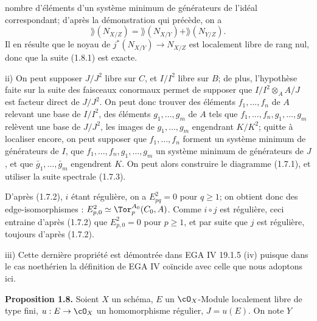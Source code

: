 nombre d'éléments d'un système minimum de générateurs de l'idéal correspondant; d'après la démonstration qui précède, on a
\[
 \rang(N_{X/Z})=\rang(N_{X/Y})+\rang(N_{Y/Z}).
\]
Il en résulte que le noyau de $j^*(N_{X/Y})\longrightarrow N_{X/Z}$ est localement libre de rang nul, donc que la suite (1.8.1) est exacte.

ii) On peut supposer $J/J^2$ libre sur $C$, et $I/I^2$ libre sur $B$; de plus, l'hypothèse faite sur la suite des faisceaux conormaux permet de supposer que $I/I^2\otimes_A A/J$ est facteur direct de $J/J^2$. On peut donc trouver des éléments $f_1,\ldots,f_n$ de $A$ relevant une base de $I/I^2$, des éléments $g_1,\ldots,g_m$ de $A$ tels que $f_1,\ldots,f_n,g_1,\ldots,g_m$ relèvent une base de $J/J^2$, les images de $g_1,\ldots,g_m$ engendrant $K/K^2$; quitte à localiser encore, on peut supposer que $f_1,\ldots,f_n$ forment un système minimum de générateurs de $I$, que $f_1,\ldots,f_n,g_1,\ldots,g_m$ un système minimum de générateurs de $J$, et que $\bar g_1,\ldots,\bar g_m$ engendrent $K$. On peut alors construire le diagramme (1.7.1), et utiliser la suite spectrale (1.7.3).

D'après (1.7.2), $i$ étant régulière, on a $E^2_{pq}=0$ pour $q\geq1$; on obtient donc des edge-isomorphismes : $E^2_{p,0}\simeq\Tor_p^{A_0}(C_0,A)$. Comme $i\circ j$ est régulière, ceci entraine d'après (1.7.2) que $E^2_{p,0}=0$ pour $p\geq1$, et par suite que $j$ est régulière, toujours d'après (1.7.2).

iii) Cette dernière propriété est démontrée dans EGA IV 19.1.5 (iv) puisque dans le cas noethérien la définition de EGA IV coïncide avec celle que nous adoptons ici.

\textbf{Proposition 1.8.} Soient \(X\) un schéma, \(E\) un \(\cO_X\)-Module localement libre de type fini, \(u:E\to\cO_X\) un homomorphisme régulier, \(J=u(E)\). On note \(Y\)

